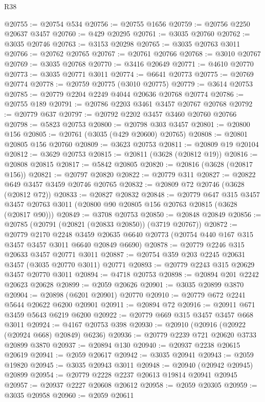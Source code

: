 \begin{lexlean}{R38}
\begin{coremodule}
@20755 := @20754 @534
@20756 := @20755 @1656
@20759 := @20756 @2250 @20637 @3457
@20760 := @429 @20295
@20761 := @3035 @20760
@20762 := @3035 @20746
@20763 := @3153 @20298
@20765 := @3035 @20763 @3011
@20766 := @20762 @20765
@20767 := @20761 @20766
@20768 := @3010 @20767
@20769 := @3035 @20768
@20770 := @3416 @20649
@20771 := @4610 @20770
@20773 := @3035 @20771 @3011
@20774 := @6641 @20773
@20775 := @20769 @20774
@20778 := @20759 @20775 (@3010 @20775)
@20779 := @3614 @20753
@20785 := @20779 @2204 @2249 @4044 @20636 @20768 @20774
@20786 := @20755 @189
@20791 := @20786 @2203 @3461 @3457 @20767 @20768
@20792 := @20779 @637
@20797 := @20792 @2202 @3457 @3460 @20760 @20766
@20798 := @5823 @20753
@20800 := @20798 @303 @3457
@20801 := @20800 @156
@20805 := @20761 (@3035 (@429 @20600) @20765)
@20808 := @20801 @20805 @156 @20760
@20809 := @3623 @20753
@20811 := @20809 @19 @20104
@20812 := @3629 @20753
@20815 := @20811 (@3628 (@20812 @19))
@20816 := @20808 @20815
@20817 := @5842 @20805
@20820 := @20816 (@3628 (@20817 @156))
@20821 := @20797 @20820
@20822 := @20779 @311
@20827 := @20822 @649 @3457 @3459 @20746 @20765
@20832 := @20809 @72 @20746 (@3628 (@20812 @72))
@20833 := @20827 @20832
@20848 := @20779
    @647
    @315
    @3457
    @3457
    @20763
    @3011
    (@20800 @90 @20805 @156 @20763 @20815 (@3628 (@20817 @90)))
@20849 := @3708 @20753
@20850 := @20848 @20849
@20856 := @20785 (@20791 (@20821 (@20833 @20850)) (@3719 @20767))
@20872 := @20779
    @2170
    @2248
    @3459
    @20635
    @6640
    @20773
    (@20754 @440 @167 @315 @3457 @3457 @3011 @6640 @20849 @6690)
@20878 := @20779 @2246 @315 @20633 @3457 @20771 @3011
@20887 := @20754 @359 @203 @2245 @20631 @3457 (@3035 @20770 @3011) @20771
@20893 := @20779 @2243 @315 @20629 @3457 @20770 @3011
@20894 := @4718 @20753
@20898 := @20894 @201 @2242 @20623 @20628
@20899 := @2059 @20626
@20901 := @3035 @20899 @3870
@20904 := @20898 (@6201 @20901) @20770
@20910 := @20779 @672 @2241 @5644 @20622 @6200 @20901
@20911 := @20894 @72
@20916 := @20911 @671 @3459 @5643 @6219 @6200
@20922 := @20779 @669 @315 @3457 @3457 @668 @3011
@20924 := @4167 @20753 @398
@20930 := @20910 (@20916 (@20922 (@20924 @668) @20849) @6236)
@20936 := @20779 @2239 @721 @20620 @3733 @20899 @3870
@20937 := @20894 @130
@20940 := @20937 @2238 @20615 @20619
@20941 := @2059 @20617
@20942 := @3035 @20941
@20943 := @2059 @19820
@20945 := @3035 @20943 @3011
@20948 := @20940 (@20942 @20945) @20899
@20954 := @20779 @2228 @2237 @20613 @19814 @20941 @20945
@20957 := @20937 @2227 @20608 @20612
@20958 := @2059 @20305
@20959 := @3035 @20958
@20960 := @2059 @20611

\end{coremodule}
\end{lexlean}

